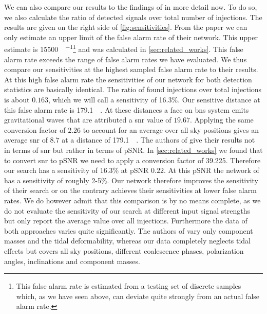 We can also compare our results to the findings of \cite{bns_network} in more detail now. To do so, we also calculate the ratio of detected signals over total number of injections. The results are given on the right side of \autoref{fig:sensitivities}. From the paper \cite{bns_network} we can only estimate an upper limit of the false alarm rate of their network. This upper estimate is \SI[per-mode=fraction]{15500}{\samples\per\month}\footnote{This false alarm rate is estimated from a testing set of discrete samples which, as we have seen above, can deviate quite strongly from an actual false alarm rate.} and was calculated in \autoref{sec:related_works}. This false alarm rate exceeds the range of false alarm rates we have evaluated. We thus compare our sensitivities at the highest sampled false alarm rate to their results.\\
At this high false alarm rate the sensitivities of our network for both detection statistics are basically identical. The ratio of found injections over total injections is about $0.163$, which we will call a sensitivity of 16.3\%. Our sensitive distance at this false alarm rate is \SI{179.1}{\mega\parsec}. At these distances a face on \gls{bns} system emits gravitational waves that are attributed a \gls{snr} value of $19.67$. Applying the same conversion factor of $2.26$ to account for an average over all sky positions gives an average \gls{snr} of $8.7$ at a distance of \SI{179.1}{\mega\parsec}. The authors of \cite{bns_network} give their results not in terms of \gls{snr} but rather in terms of pSNR. In \autoref{sec:related_works} we found that to convert \gls{snr} to pSNR we need to apply a conversion factor of 39.225. Therefore our search has a sensitivity of 16.3\% at pSNR $0.22$. At this pSNR the network of \cite{bns_network} has a sensitivity of roughly 2-5\%. Our network therefore improves the sensitivity of their search or on the contrary achieves their sensitivities at lower false alarm rates. We do however admit that this comparison is by no means complete, as we do not evaluate the sensitivity of our search at different input signal strengths but only report the average value over all injections. Furthermore the data of both approaches varies quite significantly. The authors of \cite{bns_network} vary only component masses and the tidal deformability, whereas our data completely neglects tidal effects but covers all sky positions, different coalescence phases, polarization angles, inclinations and component masses.\medskip\\
